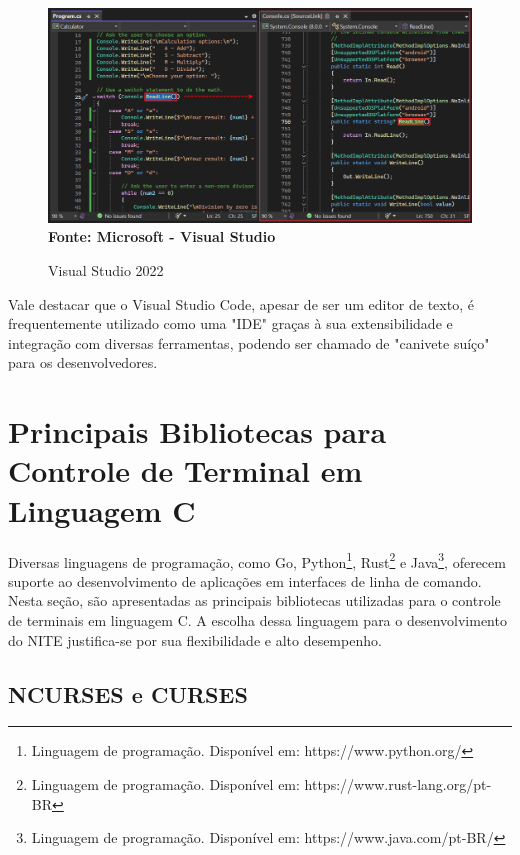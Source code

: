 \FloatBarrier
\begin{figure}[!htbp]
    \centering
    \caption{Visual Studio 2022}
    \includegraphics[scale=0.4]{imagens/VisualStudio.png}
    \\\textbf{Fonte: Microsoft - Visual Studio} \label{fig:VisualStudio}
\end{figure}
\FloatBarrier

Vale destacar que o Visual Studio Code, apesar de ser um editor de texto, é
frequentemente utilizado como uma "IDE" graças à sua extensibilidade e
integração com diversas ferramentas, podendo ser chamado de "canivete suíço" para
os desenvolvedores.

\section{Principais Bibliotecas para Controle de Terminal em Linguagem C}

Diversas linguagens de programação, como Go, Python\footnote{Linguagem de
programação. Disponível em: https://www.python.org/}, Rust\footnote{Linguagem de
programação. Disponível em: https://www.rust-lang.org/pt-BR} e Java\footnote{Linguagem
de programação. Disponível em: https://www.java.com/pt-BR/}, oferecem suporte ao
desenvolvimento de aplicações em interfaces de linha de comando. Nesta seção, são
apresentadas as principais bibliotecas utilizadas para o controle de terminais em
linguagem C. A escolha dessa linguagem para o desenvolvimento do NITE justifica-se
por sua flexibilidade e alto desempenho.

\subsection{NCURSES e CURSES}

